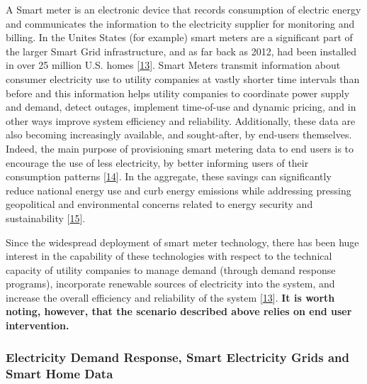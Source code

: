 \documentclass[11pt,]{article}
\begin{document}
A Smart meter is an electronic device that records consumption of
electric energy and communicates the information to the electricity
supplier for monitoring and billing. In the Unites States (for example)
smart meters are a significant part of the larger Smart Grid
infrastructure, and as far back as 2012, had been installed in over 25
million U.S. homes
{[}\protect\hyperlink{ref-hornePrivacyTechnologyNorms2015}{13}{]}. Smart
Meters transmit information about consumer electricity use to utility
companies at vastly shorter time intervals than before and this
information helps utility companies to coordinate power supply and
demand, detect outages, implement time-of-use and dynamic pricing, and
in other ways improve system efficiency and reliability. Additionally,
these data are also becoming increasingly available, and sought-after,
by end-users themselves. Indeed, the main purpose of provisioning smart
metering data to end users is to encourage the use of less electricity,
by better informing users of their consumption patterns
{[}\protect\hyperlink{ref-jui-shengchouCloudForecastingSystem2019}{14}{]}.
In the aggregate, these savings can significantly reduce national energy
use and curb energy emissions while addressing pressing geopolitical and
environmental concerns related to energy security and sustainability
{[}\protect\hyperlink{ref-graabSmartGridSmart2011}{15}{]}.

Since the widespread deployment of smart meter technology, there has
been huge interest in the capability of these technologies with respect
to the technical capacity of utility companies to manage demand (through
demand response programs), incorporate renewable sources of electricity
into the system, and increase the overall efficiency and reliability of
the system
{[}\protect\hyperlink{ref-hornePrivacyTechnologyNorms2015}{13}{]}.
\textbf{It is worth noting, however, that the scenario described above
relies on end user intervention.}

\hypertarget{electricity-demand-response-smart-electricity-grids-and-smart-home-data}{%
\subsubsection{Electricity Demand Response, Smart Electricity Grids and
Smart Home
Data}\label{electricity-demand-response-smart-electricity-grids-and-smart-home-data}}
\end{document}
